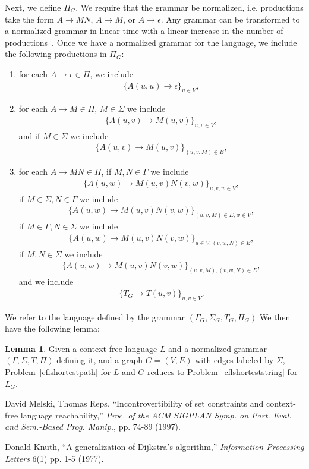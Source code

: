\documentclass[10pt,twocolumn]{article}
\theoremstyle{definition}
\newtheorem{lemma}[theorem]{Lemma}
\begin{document}
\noindent Next, we define $\Pi_G$. We require that the grammar be normalized, i.e. productions take the form $A\to MN$, $A\to M$, or $A\to\epsilon$. Any grammar can be transformed to a normalized grammar in linear time with a linear increase in the number of productions~\cite{reps97}. Once we have a normalized grammar for the language, we include the following productions in $\Pi_G$:
\begin{enumerate}
\item for each $A\to\epsilon\in\Pi$, we include
\begin{align*}
\{A(u,u)\to\epsilon\}_{u\in V},
\end{align*}
\item for each $A\to M\in\Pi$, $M\in\Sigma$ we include
\begin{align*}
\{A(u,v)\to M(u,v)\}_{u,v\in V},
\end{align*}
and if $M\in\Sigma$ we include
\begin{align*}
\{A(u,v)\to M(u,v)\}_{(u,v,M)\in E},
\end{align*}
\item for each $A\to MN\in\Pi$, if $M,N\in\Gamma$ we include
\begin{align*}
\{A(u,w)\to M(u,v)N(v,w)\}_{u,v,w\in V},
\end{align*}
if $M\in\Sigma,N\in\Gamma$ we include
\begin{align*}
\{A(u,w)\to M(u,v)N(v,w)\}_{(u,v,M)\in E,w\in V},
\end{align*}
if $M\in\Gamma,N\in\Sigma$ we include
\begin{align*}
\{A(u,w)\to M(u,v)N(v,w)\}_{u\in V,(v,w,N)\in E},
\end{align*}
if $M,N\in\Sigma$ we include
\begin{align*}
\{A(u,w)\to M(u,v)N(v,w)\}_{(u,v,M),(v,w,N)\in E},
\end{align*}
and we include
\begin{align*}
\{T_G\to T(u,v)\}_{u,v\in V}.
\end{align*}
\end{enumerate}
\noindent We refer to the language defined by the grammar $(\Gamma_G,\Sigma_G,T_G,\Pi_G)$ We then have the following lemma:
\begin{lemma}
Given a context-free language $L$ and a normalized grammar $(\Gamma,\Sigma,T,\Pi)$ defining it, and a graph $G=(V,E)$ with edges labeled by $\Sigma$, Problem~\ref{cflshortestpath} for $L$ and $G$ reduces to Problem~\ref{cflshorteststring} for $L_G$.
\end{lemma}

\begin{thebibliography}{9}

	David Melski, Thomas Reps,
	``Incontrovertibility of set constraints and context-free language reachability,''
	\emph{Proc. of the ACM SIGPLAN Symp. on Part. Eval. and Sem.-Based Prog. Manip.},
	pp. 74-89 (1997).

	Donald Knuth,
	``A generalization of Dijkstra's algorithm,''
	\emph{Information Processing Letters}
	6(1) pp. 1-5 (1977).

\end{thebibliography}
\end{document}
